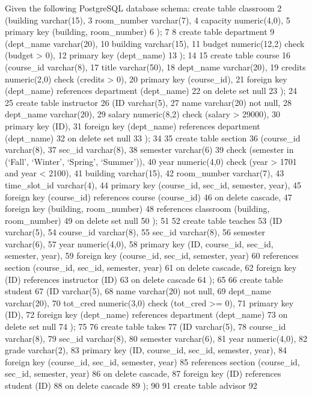 \documentclass[
  letterpaper,
  DIV=11,
  numbers=noendperiod]{scrartcl}
\begin{document}
Given the following PostgreSQL database schema: create table classroom 2
(building varchar(15), 3 room\_number varchar(7), 4 capacity
numeric(4,0), 5 primary key (building, room\_number) 6 ); 7 8 create
table department 9 (dept\_name varchar(20), 10 building varchar(15), 11
budget numeric(12,2) check (budget \textgreater{} 0), 12 primary key
(dept\_name) 13 ); 14 15 create table course 16 (course\_id varchar(8),
17 title varchar(50), 18 dept\_name varchar(20), 19 credits numeric(2,0)
check (credits \textgreater{} 0), 20 primary key (course\_id), 21
foreign key (dept\_name) references department (dept\_name) 22 on delete
set null 23 ); 24 25 create table instructor 26 (ID varchar(5), 27 name
varchar(20) not null, 28 dept\_name varchar(20), 29 salary numeric(8,2)
check (salary \textgreater{} 29000), 30 primary key (ID), 31 foreign key
(dept\_name) references department (dept\_name) 32 on delete set null 33
); 34 35 create table section 36 (course\_id varchar(8), 37 sec\_id
varchar(8), 38 semester varchar(6) 39 check (semester in (`Fall',
`Winter', `Spring', `Summer')), 40 year numeric(4,0) check (year
\textgreater{} 1701 and year \textless{} 2100), 41 building varchar(15),
42 room\_number varchar(7), 43 time\_slot\_id varchar(4), 44 primary key
(course\_id, sec\_id, semester, year), 45 foreign key (course\_id)
references course (course\_id) 46 on delete cascade, 47 foreign key
(building, room\_number) 48 references classroom (building,
room\_number) 49 on delete set null 50 ); 51 52 create table teaches 53
(ID varchar(5), 54 course\_id varchar(8), 55 sec\_id varchar(8), 56
semester varchar(6), 57 year numeric(4,0), 58 primary key (ID,
course\_id, sec\_id, semester, year), 59 foreign key (course\_id,
sec\_id, semester, year) 60 references section (course\_id, sec\_id,
semester, year) 61 on delete cascade, 62 foreign key (ID) references
instructor (ID) 63 on delete cascade 64 ); 65 66 create table student 67
(ID varchar(5), 68 name varchar(20) not null, 69 dept\_name varchar(20),
70 tot\_cred numeric(3,0) check (tot\_cred \textgreater= 0), 71 primary
key (ID), 72 foreign key (dept\_name) references department (dept\_name)
73 on delete set null 74 ); 75 76 create table takes 77 (ID varchar(5),
78 course\_id varchar(8), 79 sec\_id varchar(8), 80 semester varchar(6),
81 year numeric(4,0), 82 grade varchar(2), 83 primary key (ID,
course\_id, sec\_id, semester, year), 84 foreign key (course\_id,
sec\_id, semester, year) 85 references section (course\_id, sec\_id,
semester, year) 86 on delete cascade, 87 foreign key (ID) references
student (ID) 88 on delete cascade 89 ); 90 91 create table advisor 92
\end{document}
